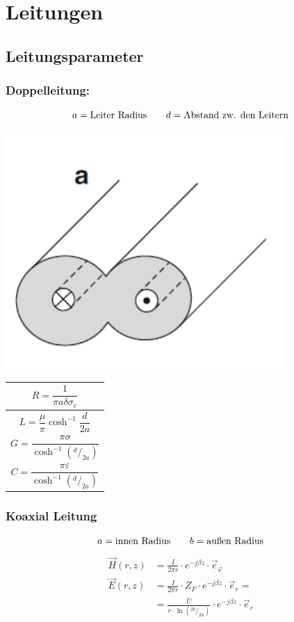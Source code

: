 \section{Leitungen}

\subsection{Leitungsparameter}

\subsubsection{Doppelleitung:}
\[
    a = \text{Leiter Radius} \qquad d = \text{Abstand zw. den Leitern} \\
\]

\includegraphics[width=0.4\columnwidth]{Figures/Doppelleitung.png}
{\renewcommand*{\arraystretch}{0.2}
    \begin{tabularx}{0.5\columnwidth}{|X|}
        \hline
        \[R  = \frac{1}{\pi a\delta\sigma_c}\]              \\
        \hline
        \[L = \frac{\mu}{\pi} \cosh^{-1}\frac{d}{2a}\]      \\
        \hline
        \[G = \frac{\pi\sigma}{\cosh^{-1}(^d/_{2a})}\]      \\
        \hline
        \[C = \frac{\pi\varepsilon}{\cosh^{-1}(^d/_{2a})}\] \\
        \hline
    \end{tabularx}}

\subsubsection{Koaxial Leitung}
\[
    a = \text{innen Radius} \qquad b = \text{außen Radius} \\
\]
\begin{align*}
    \vec{H}(r, z) & = \frac{I}{2\pi r}\cdot e^{-j\beta z}\cdot\vec{e}_\varphi                    \\
    \vec{E}(r, z) & = \frac{I}{2\pi r}\cdot Z_F\cdot e^{-j\beta z} \cdot\vec{e}_r=               \\
                  & = \frac{\hat{U}}{r \cdot\ln{(^{2b}/_{2a})}}\cdot e^{-j\beta z}\cdot\vec{e}_r
\end{align*}


